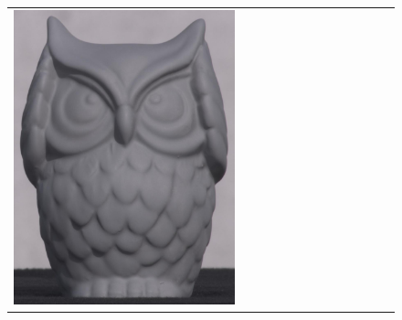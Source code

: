 \begin{figure}[!ht]
\begin{tabular}{@{}rcccccccccccc@{}}
    \includegraphics[width=\customwidth]{./figures/reconstruction/object/113346.jpg} &

\end{tabular}
\end{figure}
